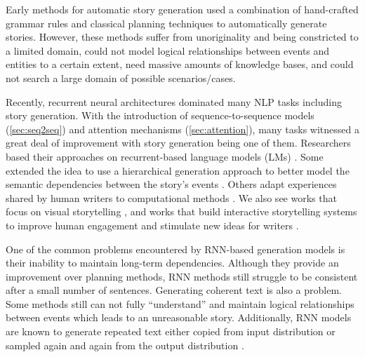 Early methods for automatic story generation used a combination of hand-crafted grammar rules \citep{ryan2017grimes, rumelhart1975notes, thorndyke1977cognitive, wilensky1983story} and classical planning techniques \citep{meehan1977tale, dehn1981story, lebowitz1984creating, lebowitz1985story, cavazza2002character, porteous2009controlling, riedl2010narrative} to automatically generate stories. However, these methods suffer from unoriginality and being constricted to a limited domain, could not model logical relationships between events and entities to a certain extent, need massive amounts of knowledge bases, and could not search a large domain of possible scenarios/cases.

Recently, recurrent neural architectures dominated many NLP tasks including story generation. With the introduction of sequence-to-sequence models (\cref{sec:seq2seq}) and attention mechanisms (\cref{sec:attention}), many tasks witnessed a great deal of improvement with story generation being one of them. Researchers based their approaches on recurrent-based language models (LMs) \citep{choi2016recurrent, harrison2017toward}. Some extended the idea to use a hierarchical generation approach to better model the semantic dependencies between the story's events \citep{martin2018event, xu2018skeleton, fan2018hierarchical}. Others adapt experiences shared by human writers to computational methods \citep{yao2019plan, yu2020draft}. We also see works that focus on visual storytelling \citep{huang2016visual, wang2018no, kim2018glac}, and works that build interactive storytelling systems to improve human engagement and stimulate new ideas for writers \citep{clark2018creative, goldfarb2019plan}.

One of the common problems encountered by RNN-based generation models is their inability to maintain long-term dependencies. Although they provide an improvement over planning methods, RNN methods still struggle to be consistent after a small number of sentences. Generating coherent text is also a problem. Some methods still can not fully ``understand'' and maintain logical relationships between events which leads to an unreasonable story. Additionally, RNN models are known to generate repeated text either copied from input distribution or sampled again and again from the output distribution \citep{herrera2020automatic}.

